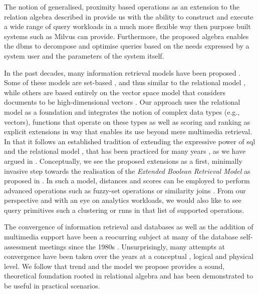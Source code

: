 The notion of generalised, proximity based operations as an extension to the relation algebra described in  provide us with the ability to construct and execute a wide range of query workloads in a much more flexible way then purpose built systems such as Milvus \cite{Wang:2021Milvus} can provide. Furthermore, the proposed algebra enables the \acrshort{dbms} to decompose and optimise queries based on the needs expressed by a system user and the parameters of the system itself. 

In the past decades, many information retrieval models have been proposed \cite{Umano:1983Retrieval,Salton:1983Extended,Wong:1985Generalized}. Some of these models are set-based \cite{Salton:1983Extended,Umano:1983Retrieval}, and thus similar to the relational model \cite{Codd:1970Relational}, while others are based entirely on the vector space model that considers documents to be high-dimensional vectors \cite{Wong:1985Generalized}. Our approach uses the relational model as a foundation and integrates the notion of complex data types (e.g., vectors), functions that operate on these types as well as scoring and ranking as explicit extensions in way that enables its use beyond mere multimedia retrieval. In that it follows an established tradition of extending the expressive power of \acrshort{sql} and the relational model \cite{Libkin:2003Expressive}, that has been practiced for many years \cite{Chengkai:2005RankSQL,Zhang:2006Boolean,Belohlavek:2007Relational}, as we have argued in . Conceptually, we see the proposed extensions as a first, minimally invasive step towards the realisation of the \emph{Extended Boolean Retrieval Model} as proposed in \cite{Salton:1983Extended}. In such a model, distances and scores can be employed to perform advanced operations such as fuzzy-set operations or similarity joins \cite{Umano:1983Retrieval,Zadeh:1996Fuzzy,Bohm:2001Fast}. From our perspective and with an eye on analytics workloads, we would also like to see query primitives such a clustering or \acrshort{rnns} \cite{Korn:2000Influence} in that list of supported operations.

The convergence of information retrieval and databases as well as the addition of multimedia support have been a reocurring subject at many of the database self-assessment meetings since the 1980s \cite{Agrawal:2008Claremont}. Unsurprisingly, many attempts at convergence have been taken over the years at a conceptual \cite{Marcus:1996Foundations,Adjeroh:1997Multimedia,Watanabe:1998Multimedia}, logical \cite{Zhang:2006Boolean,Belohlavek:2007Relational} and physical \cite{Silva:2010SimDB,Giangreco:2014Adam,Whang:2015DB,Giangreco:2016Adam,Yang:2020Pase} level. We follow that trend and the model we propose provides a sound, theoretical foundation rooted in relational algebra and has been demonstrated to be useful in practical scenarios. 

